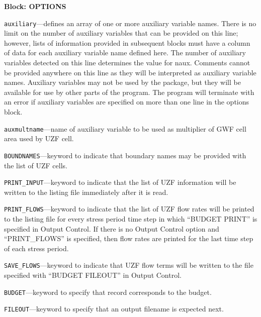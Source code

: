 
\item \textbf{Block: OPTIONS}

\begin{description}
\item \texttt{auxiliary}---defines an array of one or more auxiliary variable names.  There is no limit on the number of auxiliary variables that can be provided on this line; however, lists of information provided in subsequent blocks must have a column of data for each auxiliary variable name defined here.   The number of auxiliary variables detected on this line determines the value for naux.  Comments cannot be provided anywhere on this line as they will be interpreted as auxiliary variable names.  Auxiliary variables may not be used by the package, but they will be available for use by other parts of the program.  The program will terminate with an error if auxiliary variables are specified on more than one line in the options block.

\item \texttt{auxmultname}---name of auxiliary variable to be used as multiplier of GWF cell area used by UZF cell.

\item \texttt{BOUNDNAMES}---keyword to indicate that boundary names may be provided with the list of UZF cells.

\item \texttt{PRINT\_INPUT}---keyword to indicate that the list of UZF information will be written to the listing file immediately after it is read.

\item \texttt{PRINT\_FLOWS}---keyword to indicate that the list of UZF flow rates will be printed to the listing file for every stress period time step in which ``BUDGET PRINT'' is specified in Output Control.  If there is no Output Control option and ``PRINT\_FLOWS'' is specified, then flow rates are printed for the last time step of each stress period.

\item \texttt{SAVE\_FLOWS}---keyword to indicate that UZF flow terms will be written to the file specified with ``BUDGET FILEOUT'' in Output Control.

\item \texttt{BUDGET}---keyword to specify that record corresponds to the budget.

\item \texttt{FILEOUT}---keyword to specify that an output filename is expected next.


\end{description}
